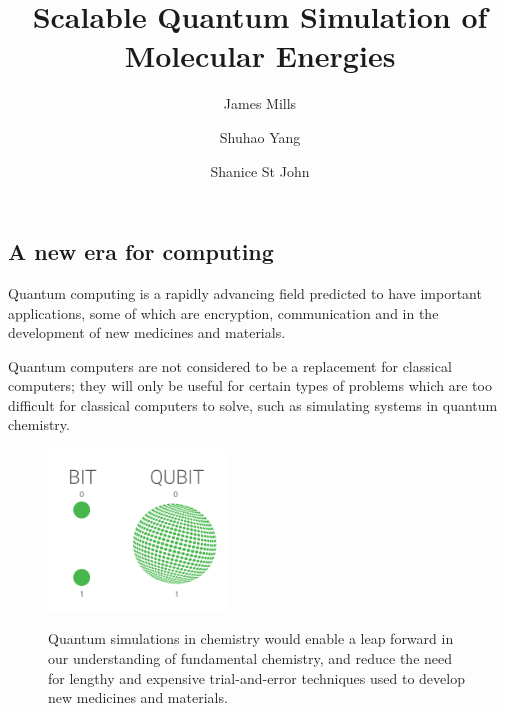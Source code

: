 \documentclass[14pt,landscape,color=UCLdarkred,margin=3cm]{uclposter}
\title{Scalable Quantum Simulation of Molecular Energies}
\author{James Mills}
\author{Shuhao Yang}
\author{Shanice St John}
\affil[1]{MSc Quantum Technologies, UCL}
\begin{document}
\large

\maketitle

\begin{multicols}{3}

\section*{A new era for computing}


Quantum computing is a rapidly advancing field predicted to have important applications, some of which are encryption, communication and in the development of new medicines and materials. 

Quantum computers are not considered to be a replacement for classical computers; they will only be useful for certain types of problems which are too difficult for classical computers to solve, such as simulating systems in quantum chemistry.
\\
\begin{figure}[H]
  \begin{center}
\setlength{\fboxsep}{0.5em}
  \begin{minipage}[c]{12em}
  \begin{center}
  \includegraphics[width=13em]{QUBIT.png}
  \end{center}
    
  \end{minipage}
  \qquad
  \begin{minipage}[c]{26em}
  \large

Quantum simulations in chemistry would enable a leap forward in our understanding of fundamental chemistry, and reduce the need for lengthy and expensive trial-and-error techniques used to develop new medicines and materials.
  \end{minipage}
  \end{center}
\end{figure}

\end{multicols}
\end{document}
